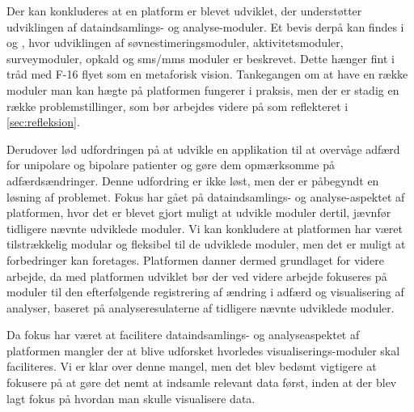 Der kan konkluderes at en platform er blevet udviklet, der understøtter udviklingen af dataindsamlings- og analyse-moduler.
Et bevis derpå kan findes i \citet{misc:soevnrapp} og \citet{misc:surveyrapp}, hvor udviklingen af søvnestimeringsmoduler, aktivitetsmoduler, surveymoduler, opkald og sms/mms moduler er beskrevet.
Dette hænger fint i tråd med F-16 flyet som en metaforisk vision.
Tankegangen om at have en række moduler man kan hægte på platformen fungerer i praksis, men der er stadig en række problemstillinger, som bør arbejdes videre på som reflekteret i \cref{sec:refleksion}.

Derudover lød udfordringen på at udvikle en applikation til at overvåge adfærd for unipolare og bipolare patienter og gøre dem opmærksomme på adfærdsændringer.
Denne udfordring er ikke løst, men der er påbegyndt en løsning af problemet.
Fokus har gået på dataindsamlings- og analyse-aspektet af platformen, hvor det er blevet gjort muligt at udvikle moduler dertil, jævnfør tidligere nævnte udviklede moduler.
Vi kan konkludere at platformen har været tilstrækkelig modular og fleksibel til de udviklede moduler, men det er muligt at forbedringer kan foretages.
Platformen danner dermed grundlaget for videre arbejde, da med platformen udviklet bør der ved videre arbejde fokuseres på moduler til den efterfølgende registrering af ændring i adfærd og visualisering af analyser, baseret på analyseresulaterne af tidligere nævnte udviklede moduler.

Da fokus har været at facilitere dataindsamlings- og analyseaspektet af platformen mangler der at blive udforsket hvorledes visualiserings-moduler skal faciliteres.
Vi er klar over denne mangel, men det blev bedømt vigtigere at fokusere på at gøre det nemt at indsamle relevant data først, inden at der blev lagt fokus på hvordan man skulle visualisere data.

